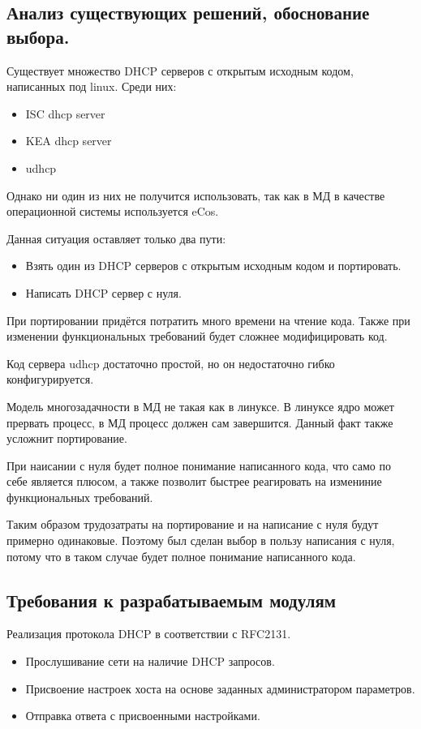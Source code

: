 \documentclass[12pt]{article}
\begin{document}
\subsection{Анализ существующих решений, обоснование выбора.}

Существует множество DHCP серверов с открытым исходным кодом, написанных под linux. Среди них:
\begin{itemize}
    \item ISC dhcp server
    \item KEA dhcp server
    \item udhcp
\end{itemize}

Однако ни один из них не получится использовать, так как в МД в качестве операционной системы используется eCos.

Данная ситуация оставляет только два пути:

\begin{itemize}
    \item Взять один из DHCP серверов с открытым исходным кодом и портировать.
    \item Написать DHCP сервер с нуля.
\end{itemize}

При портировании придётся потратить много времени на чтение кода.
Также при изменении функциональных требований будет сложнее модифицировать код.

Код сервера udhcp достаточно простой, но он недостаточно гибко конфигурируется.

Модель многозадачности в МД не такая как в линуксе.
В линуксе ядро может прервать процесс, в МД процесс должен сам завершится.
Данный факт также усложнит портирование.

При наисании с нуля будет полное понимание написанного кода, что само по себе является плюсом, а также позволит быстрее реагировать на измениние функциональных требований.

Таким образом трудозатраты на портирование и на написание с нуля будут примерно одинаковые.
Поэтому был сделан выбор в пользу написания с нуля, потому что в таком случае будет полное понимание написанного кода.

\subsection{Требования к разрабатываемым модулям}

Реализация протокола DHCP в соответствии с RFC2131.
\begin{itemize}
    \item Прослушивание сети на наличие DHCP запросов.
    \item Присвоение настроек хоста на основе заданных администратором параметров.
    \item Отправка ответа с присвоенными настройками.
\end{itemize}
\end{document}
